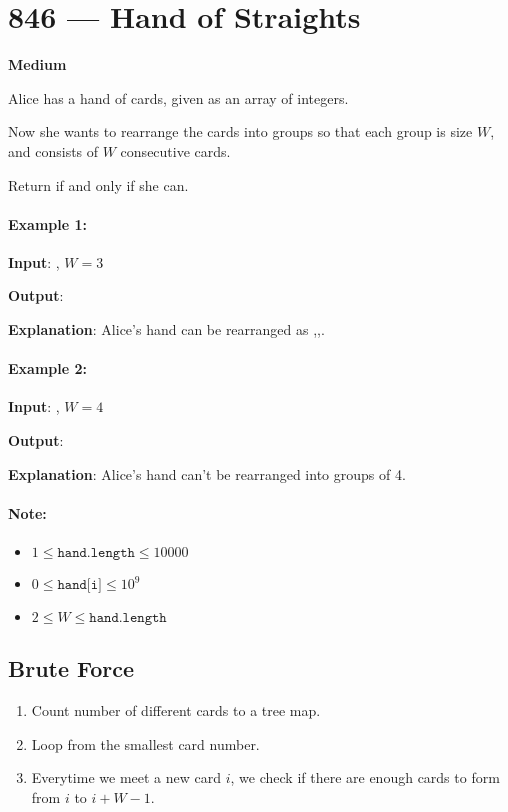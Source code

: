 \section{846 --- Hand of Straights}

\textbf{Medium}

Alice has a hand of cards, given as an array of integers.

Now she wants to rearrange the cards into groups so that each group is size $W$, and consists of $W$ consecutive cards.

Return  if and only if she can.

\paragraph{Example 1:}
\begin{flushleft}
\textbf{Input}: , $W = 3$

\textbf{Output}: 

\textbf{Explanation}: Alice's hand can be rearranged as \fcj{[1,2,3]},\fcj{[2,3,4]},\fcj{[6,7,8]}.
\end{flushleft}

\paragraph{Example 2:}
\begin{flushleft}
\textbf{Input}: , $W = 4$

\textbf{Output}: 

\textbf{Explanation}: Alice's hand can't be rearranged into groups of 4.
\end{flushleft}{}
 
\paragraph{Note:}
\begin{itemize}
\item $1 \leq \texttt{hand.length} \leq 10000$
\item $0 \leq \texttt{hand[i]} \leq 10^9 $
\item $2 \leq W \leq \texttt{hand.length}$
\end{itemize}

\subsection{Brute Force}
\begin{enumerate}
\item Count number of different cards to a tree map.
\item Loop from the smallest card number.
\item Everytime we meet a new card $i$, we check if there are enough cards to form from $i$ to $i+W-1$.
\end{enumerate}


\setcounter{lstlisting}{0}


